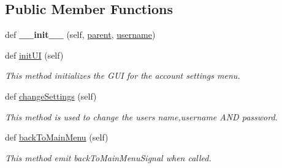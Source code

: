 \subsection*{Public Member Functions}
\begin{DoxyCompactItemize}
\item 
\hypertarget{classsrc_1_1settings__menu_1_1_account_settings_menu_a4b199df6972058b64e123acda02b72a5}{}def {\bfseries \+\_\+\+\_\+init\+\_\+\+\_\+} (self, \hyperlink{classsrc_1_1settings__menu_1_1_account_settings_menu_afe50b3829d1054937762620263272c4b}{parent}, \hyperlink{classsrc_1_1settings__menu_1_1_account_settings_menu_a54d0681d7b2c05bc084bf686a5e0cf41}{username})\label{classsrc_1_1settings__menu_1_1_account_settings_menu_a4b199df6972058b64e123acda02b72a5}

\item 
def \hyperlink{classsrc_1_1settings__menu_1_1_account_settings_menu_aeff3b2a6031f6dd312a66d0f161eeedb}{init\+U\+I} (self)
\begin{DoxyCompactList}\small\item\em This method initializes the G\+U\+I for the account settings menu. \end{DoxyCompactList}\item 
def \hyperlink{classsrc_1_1settings__menu_1_1_account_settings_menu_a10989536edbbe0db4fc03f2e5ccc8271}{change\+Settings} (self)
\begin{DoxyCompactList}\small\item\em This method is used to change the user\textquotesingle{}s name,username A\+N\+D password. \end{DoxyCompactList}\item 
def \hyperlink{classsrc_1_1settings__menu_1_1_account_settings_menu_a47dc6e6cb8a9ca5431a32ad73298ed81}{back\+To\+Main\+Menu} (self)
\begin{DoxyCompactList}\small\item\em This method emit back\+To\+Main\+Menu\+Signal when called. \end{DoxyCompactList}\end{DoxyCompactItemize}
